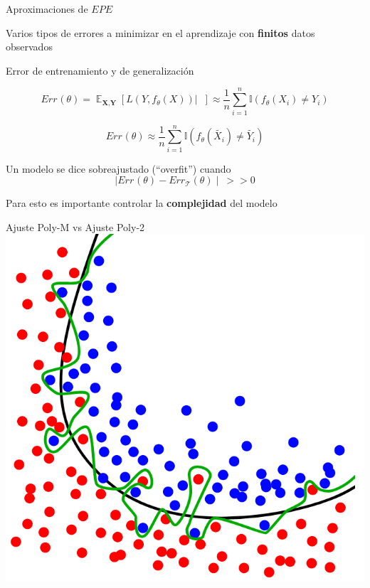 \documentclass[xcolor=x11names]{beamer}
\DeclareMathOperator{\Expect}{\mathbb{E}}
\DeclareMathOperator{\trainsetn}{\mathcal{T}^{(n)}}
\DeclareMathOperator{\trainset}{\mathcal{T}}
\DeclareMathOperator{\testsetn}{\mathcal{T_s}^{(n)}}
\DeclareMathOperator{\testset}{\mathcal{T_s}}
\begin{document}

\begin{frame}{Aproximaciones de $EPE$}

Varios tipos de errores a minimizar en el aprendizaje con \textbf{finitos} datos observados
    \begin{block}{Error de entrenamiento y de generalización}

        $$  Err_{\trainsetn}(\theta) =
        \Expect_{ \textbf{X}, \textbf{Y} } \left[ L(Y,f_{\theta}(X))  |  \trainsetn \right] \approx
        \dfrac{1}{n} \sum_{i=1}^{n} \mathbb{I} \left(f_\theta (X_{i})\neq Y_{i} \right)  $$

        $$Err_{\testsetn}(\theta) \approx
        \dfrac{1}{n} \sum_{i=1}^{n} \mathbb{I} \left(f_\theta (\tilde{X_{i}})\neq \tilde{Y_{i}} \right)  $$

	\end{block}

	Un modelo se dice sobreajustado (``overfit'') cuando
  \begin{equation*}
  \mid Err_{\testset}(\theta) - Err_{\trainset}(\theta)  \mid \ >> 0
  \end{equation*}

	Para esto es importante controlar la \textbf{complejidad} del modelo

\end{frame}


\begin{frame}{ Ajuste Poly-M vs Ajuste Poly-2 }
\center\
\includegraphics[width=0.9\textheight]{slides/wiki_overfit_complex_classifier_demo.png}
\end{frame}
\end{document}

